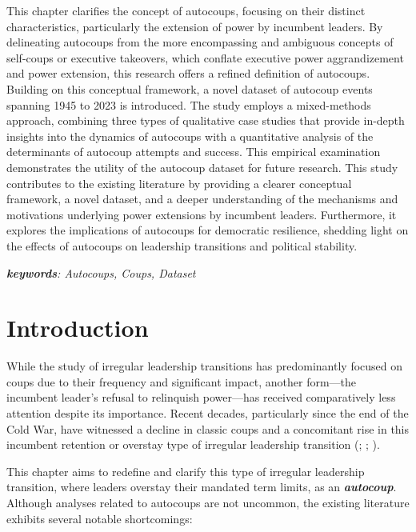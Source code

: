 \documentclass[
  12pt,
]{report}
\begin{document}
This chapter clarifies the concept of autocoups, focusing on their
distinct characteristics, particularly the extension of power by
incumbent leaders. By delineating autocoups from the more encompassing
and ambiguous concepts of self-coups or executive takeovers, which
conflate executive power aggrandizement and power extension, this
research offers a refined definition of autocoups. Building on this
conceptual framework, a novel dataset of autocoup events spanning 1945
to 2023 is introduced. The study employs a mixed-methods approach,
combining three types of qualitative case studies that provide in-depth
insights into the dynamics of autocoups with a quantitative analysis of
the determinants of autocoup attempts and success. This empirical
examination demonstrates the utility of the autocoup dataset for future
research. This study contributes to the existing literature by providing
a clearer conceptual framework, a novel dataset, and a deeper
understanding of the mechanisms and motivations underlying power
extensions by incumbent leaders. Furthermore, it explores the
implications of autocoups for democratic resilience, shedding light on
the effects of autocoups on leadership transitions and political
stability.

\emph{\textbf{keywords}: Autocoups, Coups, Dataset}

\newpage

\section{Introduction}\label{introduction-2}

While the study of irregular leadership transitions has predominantly
focused on coups due to their frequency and significant impact, another
form---the incumbent leader's refusal to relinquish power---has received
comparatively less attention despite its importance. Recent decades,
particularly since the end of the Cold War, have witnessed a decline in
classic coups and a concomitant rise in this incumbent retention or
overstay type of irregular leadership transition
(;
;
).

This chapter aims to redefine and clarify this type of irregular
leadership transition, where leaders overstay their mandated term
limits, as an \textbf{\emph{autocoup}}. Although analyses related to
autocoups are not uncommon, the existing literature exhibits several
notable shortcomings:
\end{document}
